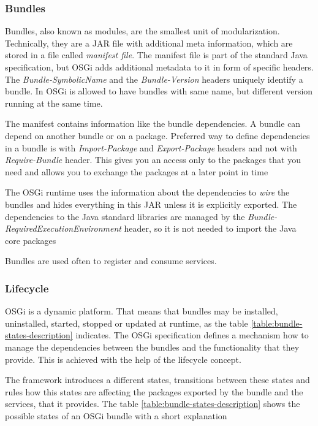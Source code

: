 \subsubsection{Bundles}
Bundles, also known as modules, are the smallest unit of modularization. Technically, they are a JAR file with additional meta information,
which are stored in a file called \textit{manifest file}. The manifest file is part of the standard Java specification, but OSGi adds additional
metadata to it in form of specific headers. The \textit{Bundle-SymbolicName} and the \textit{Bundle-Version} headers uniquely identify a
bundle. In OSGi is allowed to have bundles with same name, but different version running at the same time.

The manifest contains information like the bundle dependencies. A bundle can depend on another bundle or on a package. Preferred way
to define dependencies in a bundle is with \textit{Import-Package} and \textit{Export-Package} headers and not with \textit{Require-Bundle}
header. This gives you an access only to the packages that you need and allows you to exchange the packages at a later point in time

The OSGi runtime uses the information about the dependencies to \textit{wire} the bundles and hides everything in this JAR unless it is
explicitly exported. The dependencies to the Java standard libraries are managed by the \textit{Bundle-RequiredExecutionEnvironment}
header, so it is not needed to import the Java core packages

Bundles are used often to register and consume services.

\subsubsection{Lifecycle}
OSGi is a dynamic platform. That means that bundles may be installed, uninstalled, started, stopped or updated at runtime, as the table
\ref{table:bundle-states-description} indicates. The OSGi specification defines a mechanism how to manage the dependencies between
the bundles and the functionality that they provide. This is achieved with the help of the lifecycle concept.

The framework introduces a different states, transitions between these states and rules how this states are affecting the packages
exported by the bundle and the services, that it provides. The table \ref{table:bundle-states-description} shows the possible states
of an OSGi bundle with a short explanation

